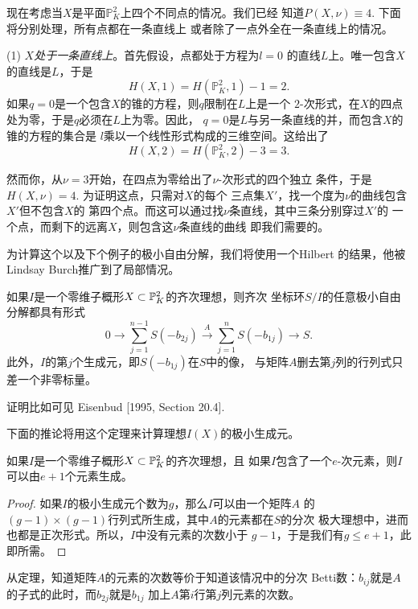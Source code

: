 现在考虑当$X$是平面$\mathbb P_K^2$上四个不同点的情况。我们已经
知道$P(X,\nu)\equiv 4$. 下面将分别处理，所有点都在一条直线上
或者除了一点外全在一条直线上的情况。

(1) \textit{$X$处于一条直线上}。首先假设，点都处于方程为$l=0$
的直线$L$上。唯一包含$X$的直线是$L$，于是
\[
	H(X,1)=H(\mathbb P_K^2,1)-1=2.
\]
如果$q=0$是一个包含$X$的锥的方程，则$q$限制在$L$上是一个
$2$-次形式，在$X$的四点处为零，于是$q$必须在$L$上为零。因此，
$q=0$是$L$与另一条直线的并，而包含$X$的锥的方程的集合是
$l$乘以一个线性形式构成的三维空间。这给出了
\[
	H(X,2)=H(\mathbb P_K^2,2)-3=3.
\]

然而你，从$\nu=3$开始，在四点为零给出了$\nu$-次形式的四个独立
条件，于是$H(X,\nu)=4$. 为证明这点，只需对$X$的每个
三点集$X'$，找一个度为$\nu$的曲线包含$X'$但不包含$X$的
第四个点。而这可以通过找$\nu$条直线，其中三条分别穿过$X'$的
一个点，而剩下的远离$X$，则包含这$\nu$条直线的曲线
即我们需要的。


为计算这个以及下个例子的极小自由分解，我们将使用一个Hilbert
的结果，他被Lindsay Burch推广到了局部情况。

\begin{thm}\label{thm:3.61}
如果$I$是一个零维子概形$X\subset \P_K^2$的齐次理想，则齐次
坐标环$S/I$的任意极小自由分解都具有形式
\[
	0\longrightarrow \sum_{j=1}^{n-1}S(-b_{2j})
	\xrightarrow{A}\sum_{j=1}^{n}S(-b_{1j})
	\longrightarrow S.
\]
此外，$I$的第$j$个生成元，即$S(-b_{1j})$在$S$中的像，
与矩阵$A$删去第$j$列的行列式只差一个非零标量。
\end{thm}

证明比如可见 Eisenbud [1995, Section 20.4].

下面的推论将用这个定理来计算理想$I(X)$的极小生成元。

\begin{coro}\label{coro:3.62}
如果$I$是一个零维子概形$X\subset \P_K^2$的齐次理想，且
如果$I$包含了一个$e$-次元素，则$I$可以由$e+1$个元素生成。
\end{coro}

\begin{proof}
如果$I$的极小生成元个数为$g$，那么$I$可以由一个矩阵$A$
的$(g-1)\times (g-1)$行列式所生成，其中$A$的元素都在$S$的分次
极大理想中，进而也都是正次形式。所以，$I$中没有元素的次数小于
$g-1$，于是我们有$g\leq e+1$，此即所需。
\end{proof}

从定理，知道矩阵$A$的元素的次数等价于知道该情况中的分次
Betti数：$b_{ij}$就是$A$的子式的此时，而$b_{2j}$就是$b_{1j}$
加上$A$第$i$行第$j$列元素的次数。


